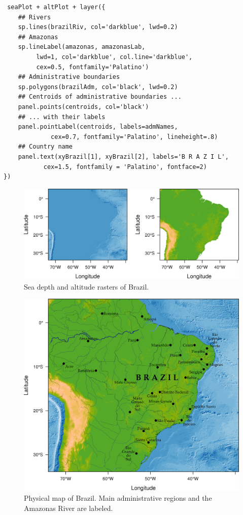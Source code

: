 \begin{enumerate}

\lstset{language=R,numbers=none}
\begin{lstlisting}
 seaPlot + altPlot + layer({
    ## Rivers
    sp.lines(brazilRiv, col='darkblue', lwd=0.2)
    ## Amazonas
    sp.lineLabel(amazonas, amazonasLab, 
		 lwd=1, col='darkblue', col.line='darkblue',
		 cex=0.5, fontfamily='Palatino')
    ## Administrative boundaries
    sp.polygons(brazilAdm, col='black', lwd=0.2)
    ## Centroids of administrative boundaries ...
    panel.points(centroids, col='black')
    ## ... with their labels
    panel.pointLabel(centroids, labels=admNames,
		     cex=0.7, fontfamily='Palatino', lineheight=.8)
    ## Country name
    panel.text(xyBrazil[1], xyBrazil[2], labels='B R A Z I L',
	       cex=1.5, fontfamily = 'Palatino', fontface=2)
})
\end{lstlisting}
\end{enumerate}

\begin{figure}[htb]
\centering
\includegraphics[width=.9\linewidth]{figs/rastersBrazil.png}
\caption{\label{fig:rastersBrazil}Sea depth and altitude rasters of Brazil.}
\end{figure}


\begin{figure}[htb]
\centering
\includegraphics[width=.9\linewidth]{figs/brazil.png}
\caption{\label{fig:brazil}Physical map of Brazil. Main administrative regions and the Amazonas River are labeled.}
\end{figure}
